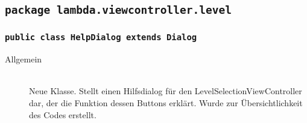\subsection{\texttt{package lambda.viewcontroller.level}}
	
\subsubsection{\normalfont \texttt{public class \textbf{HelpDialog} extends Dialog}}

\begin{description}
\item[Allgemein] \hfill \\ Neue Klasse. Stellt einen Hilfsdialog für den LevelSelectionViewController dar, der die Funktion dessen Buttons erklärt. Wurde zur Übersichtlichkeit des Codes erstellt.
\end{description}
